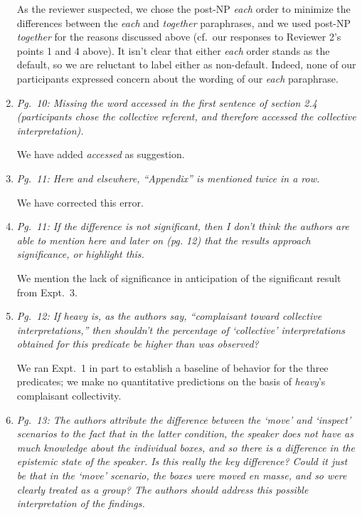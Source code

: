 \documentclass[12pt]{article}
\begin{document}
\begin{enumerate}
As the reviewer suspected, we chose the post-NP \emph{each} order to minimize the differences between the \emph{each} and \emph{together} paraphrases, and we used post-NP \emph{together} for the reasons discussed above (cf.~our responses to Reviewer 2's points 1 and 4 above). It isn't clear that either \emph{each} order stands as the default, so we are reluctant to label either as non-default. Indeed, none of our participants expressed concern about the wording of our \emph{each} paraphrase.
	
\item \emph{Pg.~10: Missing the word \emph{accessed} in the first sentence of section 2.4 (\emph{participants chose the collective referent, and therefore accessed the collective interpretation}).}

We have added \emph{accessed} as suggestion.

\item \emph{Pg.~11: Here and elsewhere, ``Appendix'' is mentioned twice in a row.}

We have corrected this error.

\item \emph{Pg.~11: If the difference is not significant, then I don't think the authors are able to mention here and later on (pg. 12) that the results approach significance, or highlight this.}

We mention the lack of significance in anticipation of the significant result from Expt.~3.

\item \emph{Pg.~12: If \emph{heavy} is, as the authors say, ``complaisant toward collective interpretations,'' then shouldn't the percentage of `collective' interpretations obtained for this predicate be higher than was observed?}

We ran Expt.~1 in part to establish a baseline of behavior for the three predicates; we make no quantitative predictions on the basis of \emph{heavy}'s complaisant collectivity.

\item \emph{Pg.~13: The authors attribute the difference between the `move' and `inspect' scenarios to the fact that in the latter condition, the speaker does not have as much knowledge about the individual boxes, and so there is a difference in the epistemic state of the speaker. Is this really the key difference? Could it just be that in the `move' scenario, the boxes were moved en masse, and so were clearly treated as a group? The authors should address this possible interpretation of the findings.}


\end{enumerate}
\end{document}
